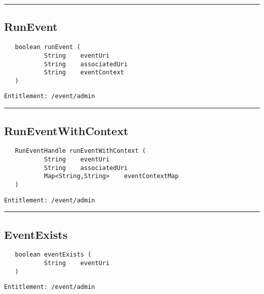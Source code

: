 \rule{12cm}{2pt}
\subsection{RunEvent}
\label{Api:RunEvent}
\begin{Verbatim}
   boolean runEvent (
           String    eventUri
           String    associatedUri
           String    eventContext
   )
\end{Verbatim}
\begin{Verbatim}[formatcom=\color{Maroon}]
  Entitlement: /event/admin
\end{Verbatim}



\rule{12cm}{2pt}
\subsection{RunEventWithContext}
\label{Api:RunEventWithContext}
\begin{Verbatim}
   RunEventHandle runEventWithContext (
           String    eventUri
           String    associatedUri
           Map<String,String>    eventContextMap
   )
\end{Verbatim}
\begin{Verbatim}[formatcom=\color{Maroon}]
  Entitlement: /event/admin
\end{Verbatim}



\rule{12cm}{2pt}
\subsection{EventExists}
\label{Api:EventExists}
\begin{Verbatim}
   boolean eventExists (
           String    eventUri
   )
\end{Verbatim}
\begin{Verbatim}[formatcom=\color{Maroon}]
  Entitlement: /event/admin
\end{Verbatim}



